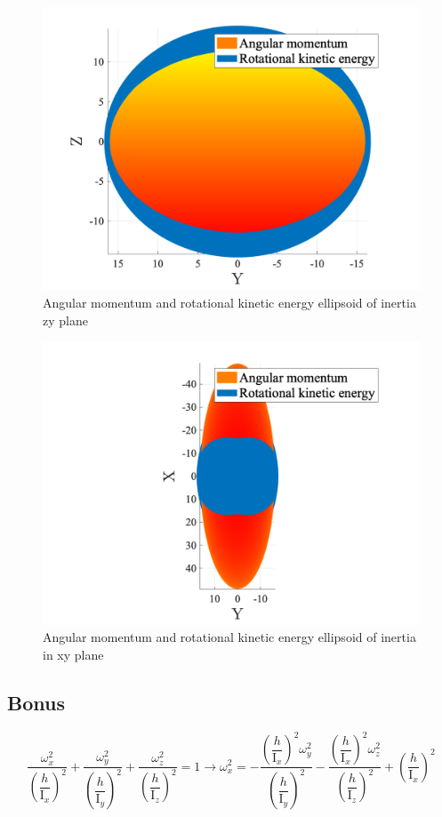 \begin{figure}[H]
    \caption{Angular momentum and rotational kinetic energy ellipsoid of inertia zy plane}
    \centering
    \includegraphics[width=12cm]{../Figure/Q1/yz_view}
\end{figure}

\begin{figure}[H]
    \caption{Angular momentum and rotational kinetic energy ellipsoid of inertia in xy plane}
    \centering
    \includegraphics[width=12cm]{../Figure/Q1/xy_view}
\end{figure}

\subsection{Bonus}

\begin{equation}
    \dfrac{\omega_x^2}{\left(\dfrac{h}{\mathrm{I}_x}\right)^2} +
    \dfrac{\omega_y^2}{\left(\dfrac{h}{\mathrm{I}_y}\right)^2} +
    \dfrac{\omega_z^2}{\left(\dfrac{h}{\mathrm{I}_z}\right)^2} = 1 \to \omega_x^2 = -\dfrac{\left(\dfrac{h}{\mathrm{I}_x}\right)^2\omega_y^2}{\left(\dfrac{h}{\mathrm{I}_y}\right)^2} -
    \dfrac{\left(\dfrac{h}{\mathrm{I}_x}\right)^2\omega_z^2}{\left(\dfrac{h}{\mathrm{I}_z}\right)^2} + \left(\dfrac{h}{\mathrm{I}_x}\right)^2
\end{equation}


